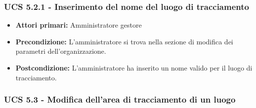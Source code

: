 \subsubsection{UCS 5.2.1 - Inserimento del nome del luogo di tracciamento}%
\begin{itemize}
    \item \textbf{Attori primari:} Amministratore gestore
    \item \textbf{Precondizione:} L'amministratore si trova nella sezione di modifica dei parametri dell'organizzazione.
    \item \textbf{Postcondizione:} L'amministratore ha inserito un nome valido per il luogo di tracciamento.
\end{itemize}

\subsubsection{UCS 5.3 - Modifica dell'area di tracciamento di un luogo}%
